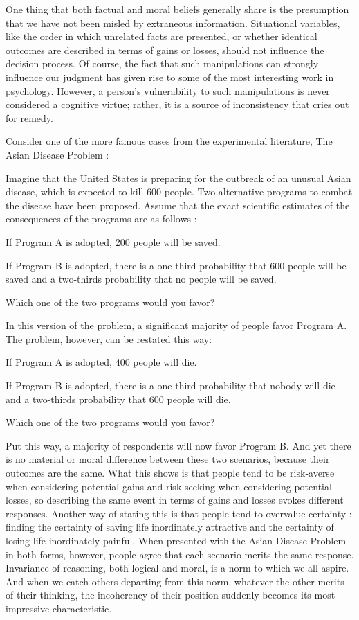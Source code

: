 \documentclass[a4paper,14pt]{extarticle}
\begin{document}
One thing that both factual and moral beliefs generally share is the presumption that we have not been misled by extraneous information.
Situational variables, like the order in which unrelated facts are presented, or whether identical outcomes are described in terms of gains or losses, should not influence the decision process.
Of course, the fact that such manipulations can strongly influence our judgment has given rise to some of the most interesting work in psychology.
However, a person’s vulnerability to such manipulations is never considered a cognitive virtue;
rather, it is a source of inconsistency that cries out for remedy.

Consider one of the more famous cases from the experimental literature, The Asian Disease Problem :

Imagine that the United States is preparing for the outbreak of an unusual Asian disease, which is expected to kill 600 people.
Two alternative programs to combat the disease have been proposed.
Assume that the exact scientific estimates of the consequences of the programs are as follows :

If Program A is adopted, 200 people will be saved.

If Program B is adopted, there is a one-third probability that 600 people will be saved and a two-thirds probability that no people will be saved.

Which one of the two programs would you favor?

In this version of the problem, a significant majority of people favor Program A.
The problem, however, can be restated this way:

If Program A is adopted, 400 people will die.

If Program B is adopted, there is a one-third probability that nobody will die and a two-thirds probability that 600 people will die.

Which one of the two programs would you favor?

Put this way, a majority of respondents will now favor Program B.
And yet there is no material or moral difference between these two scenarios, because their outcomes are the same.
What this shows is that people tend to be risk-averse when considering potential gains and risk seeking when considering potential losses, so describing the same event in terms of gains and losses evokes different responses.
Another way of stating this is that people tend to overvalue certainty :
finding the certainty of saving life inordinately attractive and the certainty of losing life inordinately painful.
When presented with the Asian Disease Problem in both forms, however, people agree that each scenario merits the same response.
Invariance of reasoning, both logical and moral, is a norm to which we all aspire.
And when we catch others departing from this norm, whatever the other merits of their thinking, the incoherency of their position suddenly becomes its most impressive characteristic.
\end{document}
